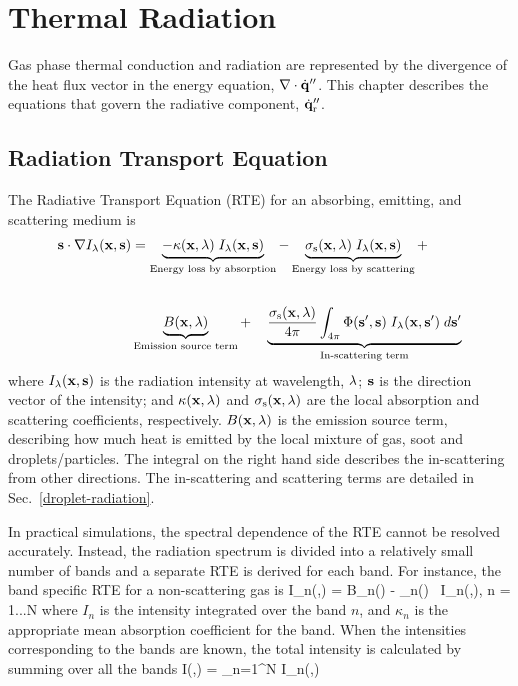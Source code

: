 

\chapter{Thermal Radiation}
\label{chapter:radiation}

Gas phase thermal conduction and radiation are represented by the divergence of the heat flux vector in the energy equation, $\nabla \cdot \dot{\mathbf{q}}''$. This chapter describes the equations that govern the radiative component, $\dot{\mathbf{q}}''_{\rm r}$.


\section{Radiation Transport Equation}
\label{RTEsection}

The Radiative Transport Equation (RTE) for an absorbing, emitting, and scattering medium is \cite{Viskanta:1987}
\begin{align}
{\mathbf{s}} \cdot \nabla I_{\lambda}({\mathbf{x}},{\mathbf{s}}) &=
\underbrace{ - \kappa({\mathbf{x}},\lambda)   \; I_\lambda({\mathbf{x}},{\mathbf{s}}) }_{\textrm{Energy loss by absorption}} -
\underbrace{\sigma_{\rm s}({\mathbf{x}},\lambda) \; I_\lambda({\mathbf{x}},{\mathbf{s}}) }_{\textrm{Energy loss by scattering}} +  \notag \\[0.25in]
& \underbrace{   B({\mathbf{x}},\lambda) }_{\textrm{Emission source term}} + \quad
\underbrace{   \frac{\sigma_{\rm s}({\mathbf{x}},\lambda)}{4\pi}
\int_{4\pi}\Phi({\mathbf{s}}',{\mathbf{s}}) \; I_{\lambda}({\mathbf{x}},{\mathbf{s}}') \; d{\mathbf{s}}'
 }_{\textrm{In-scattering term}}
\label{RTEbasic}
\end{align}
where $I_{\lambda}({\mathbf{x}},{\mathbf{s}})$ is the radiation intensity at wavelength, $\lambda$; ${\mathbf{s}}$ is the direction vector of the intensity; and $\kappa({\mathbf{x}},\lambda)$ and $\sigma_{\rm s}({\mathbf{x}},\lambda)$ are the local absorption and scattering coefficients, respectively. $B({\mathbf{x}},\lambda)$ is the emission source term, describing how much heat is emitted by the local mixture of gas, soot and droplets/particles. The integral on the right hand side describes the in-scattering from other directions. The in-scattering and scattering terms are detailed in Sec.~\ref{droplet-radiation}.

In practical simulations, the spectral dependence of the RTE cannot be resolved accurately. Instead, the radiation spectrum is divided into a relatively small number of bands and a separate RTE is derived for each band. For instance, the band specific RTE for a non-scattering gas is
\be
   \bs \cdot \nabla I_n(\bx,\bs) = B_n(\bx) - \kappa_n(\bx) \, I_n(\bx,\bs),\;\; n = 1...N  \label{bandRTE}
\ee
where $I_n$ is the intensity integrated over the band $n$, and $\kappa_n$ is the appropriate mean absorption coefficient for the band. When the intensities corresponding to the bands are known, the total intensity is calculated by summing over all the bands
\be
   I(\bx,\bs) = \sum_{n=1}^N I_n(\bx,\bs)
\ee


